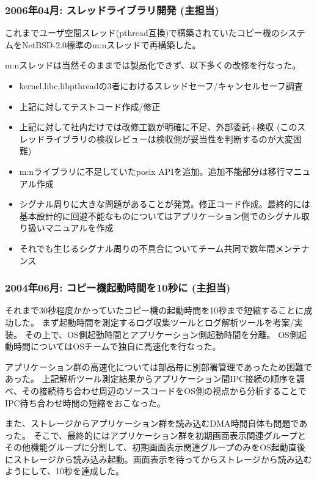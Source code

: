 \documentclass[letterpaper]{article}
\begin{document}
\subsubsection*{2006年04月: スレッドライブラリ開発 (主担当)}
これまでユーザ空間スレッド(pthread互換)で構築されていたコピー機のシステムをNetBSD-2.0標準のm:nスレッドで再構築した。

m:nスレッドは当然そのままでは製品化できず、以下多くの改修を行なった。
\begin{itemize}
  \item kernel,libc,libpthreadの3者におけるスレッドセーフ/キャンセルセーフ調査
  \item 上記に対してテストコード作成/修正
  \item 上記に対して社内だけでは改修工数が明確に不足、外部委託+検収 (このスレッドライブラリの検収レビューは検収側が妥当性を判断するのが大変困難)
  \item m:nライブラリに不足していたposix APIを追加。追加不能部分は移行マニュアル作成
  \item シグナル周りに大きな問題があることが発覚。修正コード作成。最終的には基本設計的に回避不能なものについてはアプリケーション側でのシグナル取り扱いマニュアルを作成
  \item それでも生じるシグナル周りの不具合についてチーム共同で数年間メンテナンス
\end{itemize}

\subsubsection*{2004年06月: コピー機起動時間を10秒に (主担当)}
それまで30秒程度かかっていたコピー機の起動時間を10秒まで短縮することに成功した。
まず起動時間を測定するログ収集ツールとログ解析ツールを考案/実装。
その上で、OS側起動時間とアプリケーション側起動時間を分離。
OS側起動時間についてはOSチームで独自に高速化を行なった。

アプリケーション群の高速化については部品毎に別部署管理であったため困難であった。
上記解析ツール測定結果からアプリケーション間IPC接続の順序を調べ、その接続待ち合わせ周辺のソースコードをOS側の視点から分析することでIPC待ち合わせ時間の短縮をおこなった。

また、ストレージからアプリケーション群を読み込むDMA時間自体も問題であった。
そこで、最終的にはアプリケーション群を初期画面表示関連グループとその他機能グループに分割して、初期画面表示関連グループのみをOS起動直後にストレージから読み込み起動。画面表示を待ってからストレージから読み込むようにして、10秒を達成した。
\end{document}
